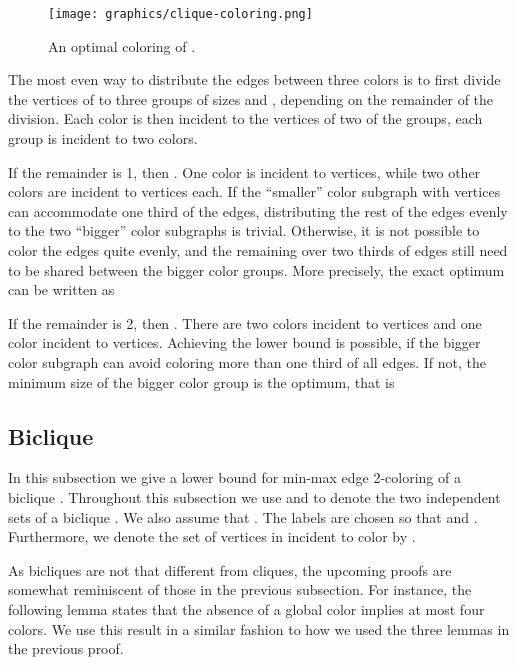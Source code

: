 \documentclass[runningheads, a4paper]{llncs}
\begin{document}
\begin{figure}[htb]
\centering \texttt{[image: graphics/clique-coloring.png]}
\caption{An optimal coloring of .}\label{img:clique-coloring}
\end{figure}

The most even way to distribute the edges between three colors is to first divide the vertices of  to three groups of sizes  and , depending on the remainder of the division. Each color is then incident to the vertices of two of the groups, each group is incident to two colors.

If the remainder is 1, then . One color is incident to  vertices, while two other colors are incident to  vertices each. If the ``smaller'' color subgraph with  vertices can accommodate one third of the edges, distributing the rest of the edges evenly to the two ``bigger'' color subgraphs is trivial. Otherwise, it is not possible to color the edges quite evenly, and the remaining over two thirds of edges still need to be shared between the bigger color groups. More precisely, the exact optimum can be written as


If the remainder is 2, then . There are two colors incident to  vertices and one color incident to  vertices. Achieving the lower bound is possible, if the bigger color subgraph can avoid coloring more than one third of all edges. If not, the minimum size of the bigger color group is the optimum, that is


\subsection{Biclique}\label{sssect:biclique}

In this subsection we give a lower bound for min-max edge 2-coloring of a biclique . Throughout this subsection we use  and  to denote the two independent sets of a biclique . We also assume that . The labels are chosen so that  and . Furthermore, we denote the set of vertices in  incident to color  by .

As bicliques are not that different from cliques, the upcoming proofs are somewhat reminiscent of those in the previous subsection. For instance, the following lemma states that the absence of a global color implies at most four colors. We use this result in a similar fashion to how we used the three lemmas in the previous proof.
\end{document}
